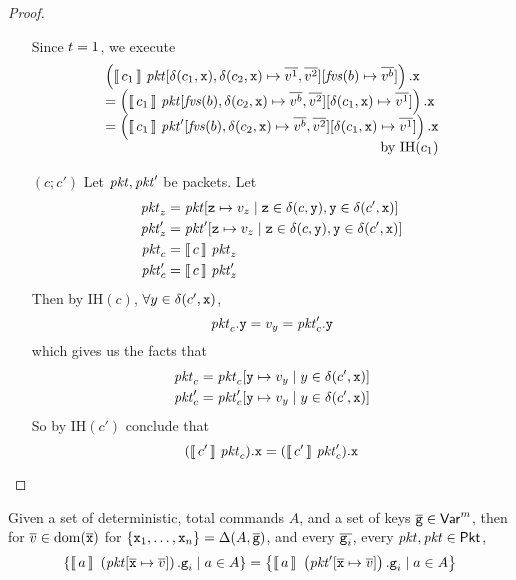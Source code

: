 \begin{proof}
\begin{enumerate}[align=left]
    Since $t = 1$, we execute
    \[\begin{array}l
        \left(\bracbb{c_1}~\pkt[\delta(c_1,\var{x}),\delta(c_2,\var{x})
        \mapsto \vec{v^1},\vec{v^2}][\fvs(b) \mapsto \vec{v^b}]\right).\var{x}
        \\ =  \left(\bracbb{c_1}~\pkt[\fvs(b),\delta(c_2,\var{x})
        \mapsto \vec{v^b}, \vec{v^2}][\delta(c_1,\var{x}) \mapsto \vec{v^1}]\right).\var{x}
        \\ = \left(\bracbb{c_1}~\pkt'[\fvs(b),\delta(c_2,\var{x})
        \mapsto \vec{v^b}, \vec{v^2}][\delta(c_1,\var{x}) \mapsto \vec{v^1}]\right).\var{x}
        \\ \multicolumn 1 r {\text{by IH}(c_1)}
      \end{array}
    \]
  \item[$(c;c')$] Let $\mathit{pkt}, \mathit{pkt}'$ be packets.
    Let
    \begin{align*}
      \mathit{pkt}_z &= \mathit{pkt}[\texttt{z} \mapsto v_z \mid \texttt{z} \in \delta(c, \texttt{y}), \texttt{y} \in \delta(c', \texttt{x})] \\
      \mathit{pkt}'_z &= \mathit{pkt}'[\texttt{z} \mapsto v_z\mid \texttt{z} \in \delta(c, \texttt{y}), \texttt{y} \in \delta(c', \texttt{x})]\\
      \mathit{pkt}_c &= \llbracket\,c\,\rrbracket~\mathit{pkt}_z \\
      \mathit{pkt}'_c &= \llbracket\,c\,\rrbracket~\mathit{pkt}'_z 
    \end{align*}
    Then by IH$(c)$, $\forall y \in \delta(c', \texttt{x})$,
    \[\mathit{pkt}_c.\texttt{y} = v_y = \mathit{pkt}'_c.\texttt{y}\]
    which gives us the facts that
    \begin{align*}
      \mathit{pkt}_c &= \mathit{pkt}_c[\texttt{y} \mapsto v_y \mid y \in \delta(c', \texttt{x})]\\
      \mathit{pkt}'_c &= \mathit{pkt}'_c[\texttt{y} \mapsto v_y \mid y \in \delta(c', \texttt{x})]
    \end{align*}
    So by IH$(c')$ conclude that 
    \[(\llbracket\,c'\,\rrbracket~\mathit{pkt}_c).\texttt{x} = (\llbracket\,c'\,\rrbracket~\mathit{pkt}'_c).\texttt{x}\]
  \end{enumerate}
\end{proof}  

\begin{proposition}
  \label{prop:single-Delta-dom}
  Given a set of deterministic, total commands $A$, and a set of keys
  $\overline{\texttt{g}} \in \mathsf{Var}^m$, then for $\overline{v} \in \mathrm{dom}(\overline{\texttt{x}})$
  for $\{\texttt{x}_1, \ldots, \texttt{x}_n\} = \Delta(A,\overline{\texttt{g}})$, and
  every $\overline{\texttt{g}_i}$, every $\mathit{pkt}, \mathit{pkt} \in \mathsf{Pkt}$,
  \[\left\{\llbracket\,a\,\rrbracket~\left(\mathit{pkt}[\overline{\texttt{x}} \mapsto \overline{v}]\right).\texttt{g}_i \mid a \in A \right\}
  = \left\{\llbracket\,a\,\rrbracket~\left(\mathit{pkt}'[\overline{\texttt{x}} \mapsto \overline{v}]\right).\texttt{g}_i \mid a \in A \right\}\]
\end{proposition}

